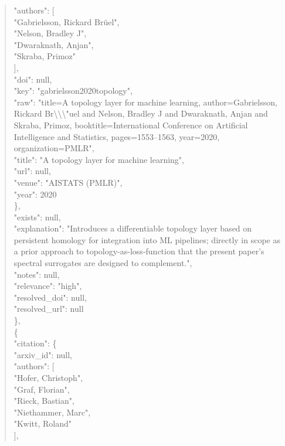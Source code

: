\documentclass[11pt]{article}
\begin{document}
\begin{quote}
        "authors": [\\
          "Gabrielsson, Rickard Brüel",\\
          "Nelson, Bradley J",\\
          "Dwaraknath, Anjan",\\
          "Skraba, Primoz"\\
        ],\\
        "doi": null,\\
        "key": "gabrielsson2020topology",\\
        "raw": "title=A topology layer for machine learning, author=Gabrielsson, Rickard Br\textbackslash{}\textbackslash{}\textbackslash{}"uel and Nelson, Bradley J and Dwaraknath, Anjan and Skraba, Primoz, booktitle=International Conference on Artificial Intelligence and Statistics, pages=1553--1563, year=2020, organization=PMLR",\\
        "title": "A topology layer for machine learning",\\
        "url": null,\\
        "venue": "AISTATS (PMLR)",\\
        "year": 2020\\
      \},\\
      "exists": null,\\
      "explanation": "Introduces a differentiable topology layer based on persistent homology for integration into ML pipelines; directly in scope as a prior approach to topology-as-loss-function that the present paper's spectral surrogates are designed to complement.",\\
      "notes": null,\\
      "relevance": "high",\\
      "resolved\_doi": null,\\
      "resolved\_url": null\\
    \},\\
    \{\\
      "citation": \{\\
        "arxiv\_id": null,\\
        "authors": [\\
          "Hofer, Christoph",\\
          "Graf, Florian",\\
          "Rieck, Bastian",\\
          "Niethammer, Marc",\\
          "Kwitt, Roland"\\
        ],\\

\end{quote}
\end{document}

